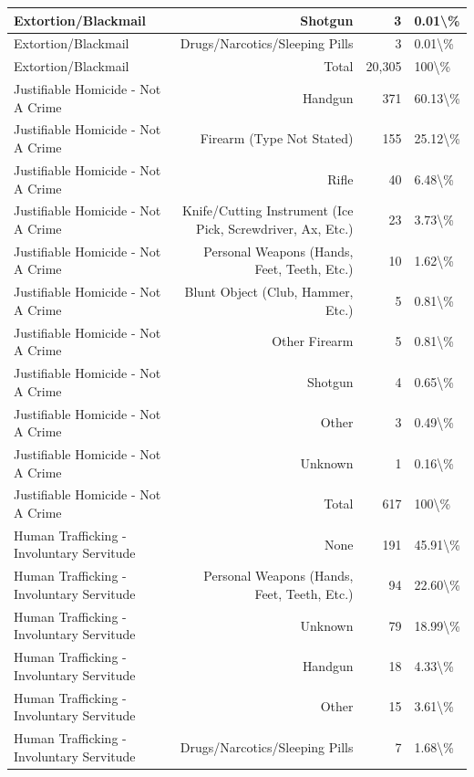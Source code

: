 \documentclass[
]{krantz}
\begin{document}
\begin{longtable}[t]{l|r|r|l}
\hline
Extortion/Blackmail & Shotgun & 3 & 0.01\textbackslash{}\%\\
\hline
Extortion/Blackmail & Drugs/Narcotics/Sleeping Pills & 3 & 0.01\textbackslash{}\%\\
\hline
Extortion/Blackmail & Total & 20,305 & 100\textbackslash{}\%\\
\hline
Justifiable Homicide - Not A Crime & Handgun & 371 & 60.13\textbackslash{}\%\\
\hline
Justifiable Homicide - Not A Crime & Firearm (Type Not Stated) & 155 & 25.12\textbackslash{}\%\\
\hline
Justifiable Homicide - Not A Crime & Rifle & 40 & 6.48\textbackslash{}\%\\
\hline
Justifiable Homicide - Not A Crime & Knife/Cutting Instrument (Ice Pick, Screwdriver, Ax, Etc.) & 23 & 3.73\textbackslash{}\%\\
\hline
Justifiable Homicide - Not A Crime & Personal Weapons (Hands, Feet, Teeth, Etc.) & 10 & 1.62\textbackslash{}\%\\
\hline
Justifiable Homicide - Not A Crime & Blunt Object (Club, Hammer, Etc.) & 5 & 0.81\textbackslash{}\%\\
\hline
Justifiable Homicide - Not A Crime & Other Firearm & 5 & 0.81\textbackslash{}\%\\
\hline
Justifiable Homicide - Not A Crime & Shotgun & 4 & 0.65\textbackslash{}\%\\
\hline
Justifiable Homicide - Not A Crime & Other & 3 & 0.49\textbackslash{}\%\\
\hline
Justifiable Homicide - Not A Crime & Unknown & 1 & 0.16\textbackslash{}\%\\
\hline
Justifiable Homicide - Not A Crime & Total & 617 & 100\textbackslash{}\%\\
\hline
Human Trafficking - Involuntary Servitude & None & 191 & 45.91\textbackslash{}\%\\
\hline
Human Trafficking - Involuntary Servitude & Personal Weapons (Hands, Feet, Teeth, Etc.) & 94 & 22.60\textbackslash{}\%\\
\hline
Human Trafficking - Involuntary Servitude & Unknown & 79 & 18.99\textbackslash{}\%\\
\hline
Human Trafficking - Involuntary Servitude & Handgun & 18 & 4.33\textbackslash{}\%\\
\hline
Human Trafficking - Involuntary Servitude & Other & 15 & 3.61\textbackslash{}\%\\
\hline
Human Trafficking - Involuntary Servitude & Drugs/Narcotics/Sleeping Pills & 7 & 1.68\textbackslash{}\%\\

\end{longtable}
\end{document}
